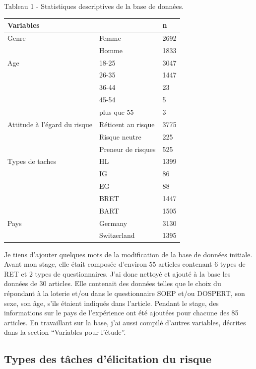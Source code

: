 \documentclass[12pt]{article}
\begin{document}
Tableau 1 - Statistiques descriptives de la base de données.

\begin{longtable}[]{@{}lll@{}}
\toprule()
Variables & & n \\
\midrule()
\endhead
Genre & Femme & 2692 \\
& Homme & 1833 \\
Age & 18-25 & 3047 \\
& 26-35 & 1447 \\
& 36-44 & 23 \\
& 45-54 & 5 \\
& plus que 55 & 3 \\
Attitude à l'égard du risque & Réticent au risque & 3775 \\
& Risque neutre & 225 \\
& Preneur de risques & 525 \\
Types de taches & HL & 1399 \\
& IG & 86 \\
& EG & 88 \\
& BRET & 1447 \\
& BART & 1505 \\
Pays & Germany & 3130 \\
& Switzerland & 1395 \\
\bottomrule()
\end{longtable}

Je tiens d'ajouter quelques mots de la modification de la base de
données initiale. Avant mon stage, elle était composée d'environ 55
articles contenant 6 types de RET et 2 types de questionnaires. J'ai
donc nettoyé et ajouté à la base les données de 30 articles. Elle
contenait des données telles que le choix du répondant à la loterie
et/ou dans le questionnaire SOEP et/ou DOSPERT, son sexe, son âge, s'ils
étaient indiqués dans l'article. Pendant le stage, des informations sur
le pays de l'expérience ont été ajoutées pour chacune des 85 articles.
En travaillant sur la base, j'ai aussi compilé d'autres variables,
décrites dans la section ``Variables pour l'étude''.

\subsection{Types des tâches d'élicitation du risque}
\end{document}
